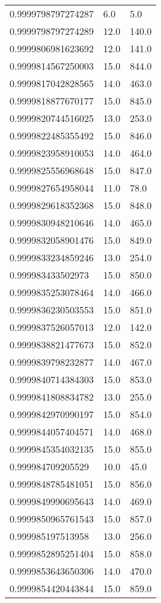 \begin{center}
\begin{supertabular}[H]{p{0.30\textwidth}p{0.05\textwidth}p{0.05\textwidth}}
0.9999798797274287 & 6.0 & 5.0 \\ 
0.9999798797274289 & 12.0 & 140.0 \\ 
0.9999806981623692 & 12.0 & 141.0 \\ 
0.9999814567250003 & 15.0 & 844.0 \\ 
0.9999817042828565 & 14.0 & 463.0 \\ 
0.9999818877670177 & 15.0 & 845.0 \\ 
0.9999820744516025 & 13.0 & 253.0 \\ 
0.9999822485355492 & 15.0 & 846.0 \\ 
0.9999823958910053 & 14.0 & 464.0 \\ 
0.9999825556968648 & 15.0 & 847.0 \\ 
0.9999827654958044 & 11.0 & 78.0 \\ 
0.9999829618352368 & 15.0 & 848.0 \\ 
0.9999830948210646 & 14.0 & 465.0 \\ 
0.9999832058901476 & 15.0 & 849.0 \\ 
0.9999833234859246 & 13.0 & 254.0 \\ 
0.999983433502973 & 15.0 & 850.0 \\ 
0.9999835253078464 & 14.0 & 466.0 \\ 
0.9999836230503553 & 15.0 & 851.0 \\ 
0.9999837526057013 & 12.0 & 142.0 \\ 
0.9999838821477673 & 15.0 & 852.0 \\ 
0.9999839798232877 & 14.0 & 467.0 \\ 
0.9999840714384303 & 15.0 & 853.0 \\ 
0.9999841808834782 & 13.0 & 255.0 \\ 
0.9999842970990197 & 15.0 & 854.0 \\ 
0.9999844057404571 & 14.0 & 468.0 \\ 
0.9999845354032135 & 15.0 & 855.0 \\ 
0.999984709205529 & 10.0 & 45.0 \\ 
0.9999848785481051 & 15.0 & 856.0 \\ 
0.9999849990695643 & 14.0 & 469.0 \\ 
0.9999850965761543 & 15.0 & 857.0 \\ 
0.999985197513958 & 13.0 & 256.0 \\ 
0.9999852895251404 & 15.0 & 858.0 \\ 
0.9999853643650306 & 14.0 & 470.0 \\ 
0.9999854420443844 & 15.0 & 859.0 \\ 

\end{supertabular}
\end{center}
